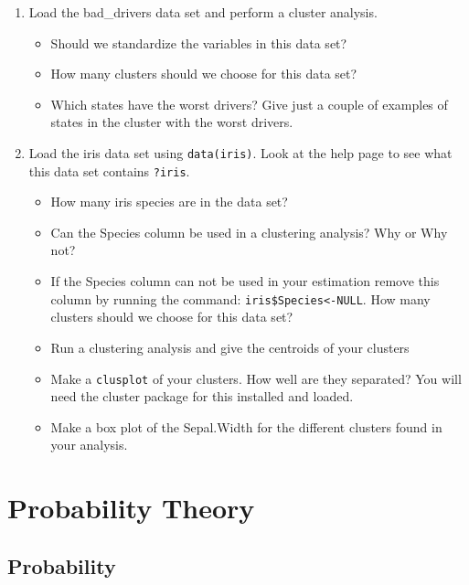 \documentclass[
]{book}
\providecommand{\tightlist}{%
  \setlength{\itemsep}{0pt}\setlength{\parskip}{0pt}}
\theoremstyle{definition}
\theoremstyle{definition}
\theoremstyle{definition}
\theoremstyle{definition}
\theoremstyle{remark}
\begin{document}
\begin{enumerate}
\def\labelenumi{\arabic{enumi}.}
\item
  Load the bad\_drivers data set and perform a cluster analysis.

  \begin{itemize}
  \tightlist
  \item
    Should we standardize the variables in this data set?
  \item
    How many clusters should we choose for this data set?
  \item
    Which states have the worst drivers? Give just a couple of examples of states in the cluster with the worst drivers.
  \end{itemize}
\item
  Load the iris data set using \texttt{data(iris)}. Look at the help page to see what this data set contains \texttt{?iris}.

  \begin{itemize}
  \tightlist
  \item
    How many iris species are in the data set?
  \item
    Can the Species column be used in a clustering analysis? Why or Why not?
  \item
    If the Species column can not be used in your estimation remove this column by running the command: \texttt{iris\$Species\textless{}-NULL}. How many clusters should we choose for this data set?
  \item
    Run a clustering analysis and give the centroids of your clusters
  \item
    Make a \texttt{clusplot} of your clusters. How well are they separated? You will need the cluster package for this installed and loaded.
  \item
    Make a box plot of the Sepal.Width for the different clusters found in your analysis.
  \end{itemize}
\end{enumerate}

\hypertarget{part-probability-theory}{%
\part{Probability Theory}\label{part-probability-theory}}

\hypertarget{probability}{%
\chapter{Probability}\label{probability}}
\end{document}
